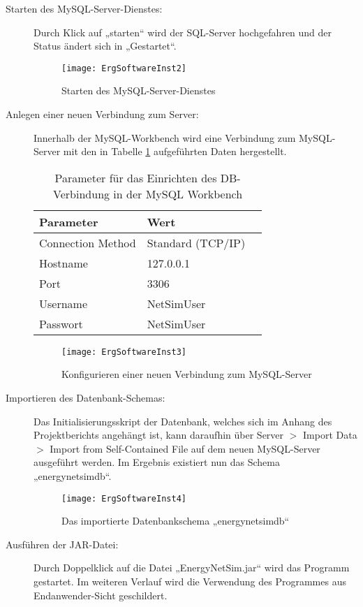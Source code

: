 \begin{description}
\item [Starten des MySQL-Server-Dienstes:]
Durch Klick auf „starten“ wird der SQL-Server hochgefahren und der Status ändert sich in „Gestartet“.
\begin{figure}[ht]
	\centering
	\texttt{[image: ErgSoftwareInst2]}
	\caption{Starten des MySQL-Server-Dienstes}
	\label{fig:ErgSoftwareInst2}
\end{figure}
\item [Anlegen einer neuen Verbindung zum Server:]
Innerhalb der MySQL-Workbench wird eine Verbindung zum MySQL-Server mit den in Tabelle \ref{tab:mysql} aufgeführten Daten hergestellt.
\begin{table}[ht]
\centering
	 \begin{tabular}{|l|l|l|}
	 \hline
	Parameter & Wert\\
	\hline
	\hline
	Connection Method & Standard (TCP/IP)\\
	 \hline
	Hostname & 127.0.0.1\\
	 \hline
	Port & 3306\\
	 \hline
	Username & NetSimUser\\
	 \hline
	Passwort & NetSimUser\\
	 \hline
	 \end{tabular}
\caption{Parameter für das Einrichten des DB-Verbindung in der MySQL Workbench}
\label{tab:mysql}
\end{table}
\begin{figure}[ht]
	\centering
	\texttt{[image: ErgSoftwareInst3]}
	\caption{Konfigurieren einer neuen Verbindung zum MySQL-Server}
	\label{fig:ErgSoftwareInst3}
\end{figure}
\item [Importieren des Datenbank-Schemas:] Das Initialisierungsskript der Datenbank, welches sich im Anhang des Projektberichts angehängt ist, kann daraufhin über Server $ > $ Import Data $ > $ Import from Self-Contained File auf dem neuen MySQL-Server ausgeführt werden. Im Ergebnis existiert nun das Schema „energynetsimdb“.
\begin{figure}[ht]
	\centering
	\texttt{[image: ErgSoftwareInst4]}
	\caption{Das importierte Datenbankschema „energynetsimdb“}
	\label{fig:ErgSoftwareInst4}
\end{figure}
\item [Ausführen der JAR-Datei:] Durch Doppelklick auf die Datei „EnergyNetSim.jar“ wird das Programm gestartet. Im weiteren Verlauf wird die Verwendung des Programmes aus Endanwender-Sicht geschildert.
\end{description}

